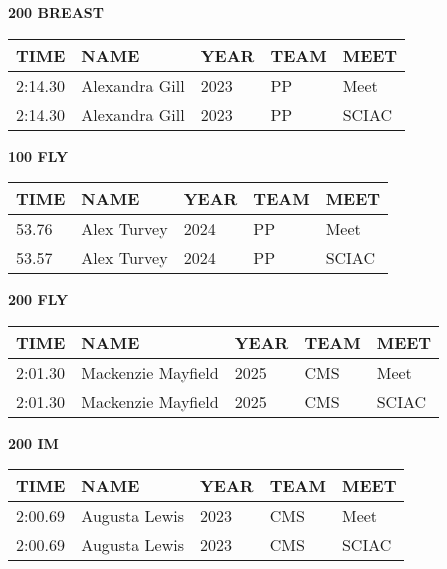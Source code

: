 \vspace{0.4cm}

\begin{minipage}[t]{0.48\textwidth}
\centering
\textbf{200 BREAST}\\[0.05cm]
\begin{tabular}{@{}p{1.8cm}p{2.8cm}p{1.2cm}p{1.4cm}p{1.4cm}@{}}
\hline
\textbf{TIME} & \textbf{NAME} & \textbf{YEAR} & \textbf{TEAM} & \textbf{MEET} \\
\hline
2:14.30 & Alexandra Gill & 2023 & PP & Meet \\
2:14.30 & Alexandra Gill & 2023 & PP & SCIAC \\
\hline
\end{tabular}
\end{minipage}\hfill
\begin{minipage}[t]{0.48\textwidth}
\centering
\textbf{100 FLY}\\[0.05cm]
\begin{tabular}{@{}p{1.8cm}p{2.8cm}p{1.2cm}p{1.4cm}p{1.4cm}@{}}
\hline
\textbf{TIME} & \textbf{NAME} & \textbf{YEAR} & \textbf{TEAM} & \textbf{MEET} \\
\hline
53.76 & Alex Turvey & 2024 & PP & Meet \\
53.57 & Alex Turvey & 2024 & PP & SCIAC \\
\hline
\end{tabular}
\end{minipage}

\vspace{0.4cm}

\begin{minipage}[t]{0.48\textwidth}
\centering
\textbf{200 FLY}\\[0.05cm]
\begin{tabular}{@{}p{1.8cm}p{2.8cm}p{1.2cm}p{1.4cm}p{1.4cm}@{}}
\hline
\textbf{TIME} & \textbf{NAME} & \textbf{YEAR} & \textbf{TEAM} & \textbf{MEET} \\
\hline
2:01.30 & Mackenzie Mayfield & 2025 & CMS & Meet \\
2:01.30 & Mackenzie Mayfield & 2025 & CMS & SCIAC \\
\hline
\end{tabular}
\end{minipage}\hfill
\begin{minipage}[t]{0.48\textwidth}
\centering
\textbf{200 IM}\\[0.05cm]
\begin{tabular}{@{}p{1.8cm}p{2.8cm}p{1.2cm}p{1.4cm}p{1.4cm}@{}}
\hline
\textbf{TIME} & \textbf{NAME} & \textbf{YEAR} & \textbf{TEAM} & \textbf{MEET} \\
\hline
2:00.69 & Augusta Lewis & 2023 & CMS & Meet \\
2:00.69 & Augusta Lewis & 2023 & CMS & SCIAC \\
\hline
\end{tabular}
\end{minipage}

